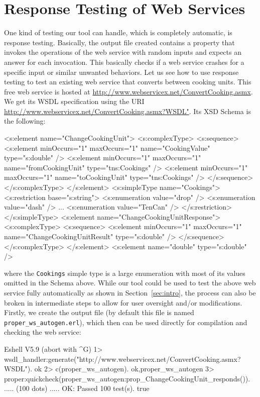 \documentclass[copyright]{eptcs}
\begin{document}
\section{Response Testing of Web Services} \label{sec:response_testing}

One kind of testing our tool can handle, which is completely
automatic, is response testing. Basically, the output file created
contains a property that invokes the operations of the web service
with random inputs and expects an answer for each invocation. This
basically checks if a web service crashes for a specific input or
similar unwanted behaviors.
%
Let us see how to use response testing to test an existing web service
that converts between cooking units. This free web service is hosted
at \url{http://www.webservicex.net/ConvertCooking.asmx}. We get its
WSDL specification using the URI
\url{http://www.webservicex.net/ConvertCooking.asmx?WSDL"}.
Its XSD Schema is the following:
\begin{lstxsd}
  <s:element name="ChangeCookingUnit">
    <s:complexType>
      <s:sequence>
        <s:element minOccurs="1" maxOccurs="1" name="CookingValue" type="s:double" />
        <s:element minOccurs="1" maxOccurs="1" name="fromCookingUnit" type="tns:Cookings" />
        <s:element minOccurs="1" maxOccurs="1" name="toCookingUnit" type="tns:Cookings" />
      </s:sequence>
    </s:complexType>
  </s:element>
  <s:simpleType name="Cookings">
    <s:restriction base="s:string">
      <s:enumeration value="drop" />
      <s:enumeration value="dash" />
      ...
      <s:enumeration value="TenCan" />
    </s:restriction>
  </s:simpleType>
  <s:element name="ChangeCookingUnitResponse">
    <s:complexType>
      <s:sequence>
        <s:element minOccurs="1" maxOccurs="1" name="ChangeCookingUnitResult" type="s:double" />
      </s:sequence>
    </s:complexType>
  </s:element>
  <s:element name="double" type="s:double" />
\end{lstxsd}
where the \texttt{Cookings} simple type is a large enumeration with
most of its values omitted in the Schema above. While our tool could
be used to test the above web service fully automatically as shown in
Section~\ref{sec:intro}, the process can also be broken in
intermediate steps to allow for user oversight and/or modifications.
Firstly, we create the output file (by default this file is named
\texttt{proper\_ws\_autogen.erl}), which then can be used directly for
compilation and checking the web service:

\begin{lstoutput}
Eshell V5.9  (abort with ^G)
1> wsdl_handler:generate("http://www.webservicex.net/ConvertCooking.asmx?WSDL").
ok
2> c(proper_ws_autogen).
{ok,proper_ws_autogen}
3> proper:quickcheck(proper_ws_autogen:prop_ChangeCookingUnit_responds()).
..... (100 dots) .....
OK: Passed 100 test(s).
true
\end{lstoutput}
\end{document}

